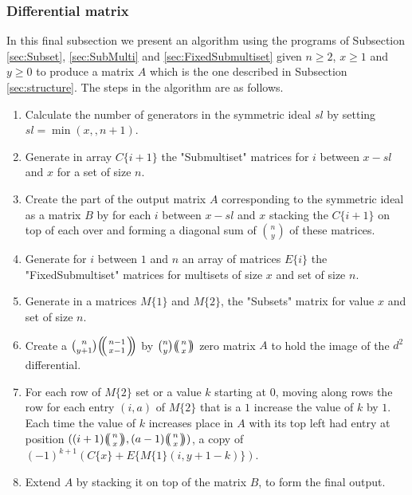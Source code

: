 \documentclass{article}
\theoremstyle{plain}
\theoremstyle{definition}
\numberwithin{thm}{section}
\begin{document}
			
			\subsubsection{Differential matrix}\label{sec:Diffmatrix}
				
				In this final subsection we present an algorithm using the programs of Subsection \ref{sec:Subset}, \ref{sec:SubMulti} and \ref{sec:FixedSubmultiset}
				given $n\geq 2$, $x\geq 1$ and $y\geq 0$ to produce a matrix $A$ which is the one described in Subsection \ref{sec:structure}.
				The steps in the algorithm are as follows.
					\begin{enumerate}
						\item
							Calculate the number of generators in the symmetric ideal $sl$ by setting $sl=\min(x,,n+1)$. 
						\item
							Generate in array $C\{ i+1 \}$ the "Submultiset" matrices for $i$ between $x-sl$ and $x$ for a set of size $n$.
						\item
							Create the part of the output matrix $A$ corresponding to the symmetric ideal as a matrix $B$ by
							for each $i$ between $x-sl$ and $x$ stacking the $C\{ i+1 \}$ on top of each over and forming a diagonal sum of $\binom{n}{y}$ of these matrices.
						\item
							Generate for $i$ between $1$ and $n$ an array of matrices $E \{ i \}$ the "FixedSubmultiset" matrices for multisets of size $x$ and set of size $n$.
						\item
							Generate in a matrices $M\{1\}$ and $M\{2\}$, the "Subsets" matrix for value $x$ and set of size $n$.
						\item
							Create a $\binom{n}{y+1}{\ensuremath{\left(\kern-.3em\left(\genfrac{}{}{0pt}{}{{n-1}}{{x-1}}\right)\kern-.3em\right)}}$ by $\binom{n}{y}{\ensuremath{\left(\kern-.3em\left(\genfrac{}{}{0pt}{}{{n}}{{x}}\right)\kern-.3em\right)}}$ zero matrix $A$ to hold the image of the $d^2$ differential.
						\item
							For each row of $M\{2\}$ set or a value $k$ starting at $0$,
							moving along rows the row for each entry $(i,a)$ of $M\{2\}$ that is a $1$ increase the value of $k$ by $1$.
							Each time the value of $k$ increases place in $A$ with its top left had entry at position $((i+1){\ensuremath{\left(\kern-.3em\left(\genfrac{}{}{0pt}{}{{n}}{{x}}\right)\kern-.3em\right)}},(a-1){\ensuremath{\left(\kern-.3em\left(\genfrac{}{}{0pt}{}{{n}}{{x}}\right)\kern-.3em\right)}})$,
							a copy of $(-1)^{k+1}(C\{ x \}+E\{ M\{ 1 \}(i,y+1-k) \})$.
						\item
							Extend $A$ by stacking it on top of the matrix $B$, to form the final output.
					\end{enumerate}
			
\end{document}
